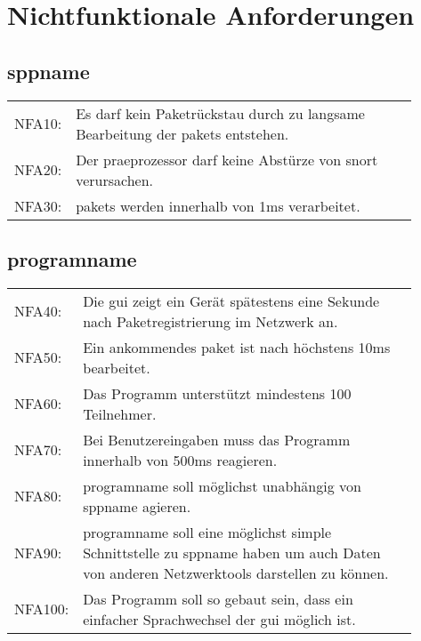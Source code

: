 \chapter{Nichtfunktionale Anforderungen}

\section{\gls{sppname}}
\begin{tabular}{lp{0.9\linewidth}}
NFA10: & Es darf kein Paketrückstau durch zu langsame Bearbeitung der \glspl{paket} entstehen. \\

NFA20: & Der \gls{praeprozessor} darf keine Abstürze von \gls{snort} verursachen. \\

NFA30: & \glspl{paket} werden innerhalb von 1ms verarbeitet.
\end{tabular}
\section{\gls{programname}}
\begin{tabular}{lp{0.9\linewidth}}
NFA40: & Die \gls{gui} zeigt ein Gerät spätestens eine Sekunde nach Paketregistrierung im Netzwerk an. \\

NFA50: & Ein ankommendes \gls{paket} ist nach höchstens 10ms bearbeitet. \\

NFA60: & Das Programm unterstützt mindestens 100 Teilnehmer. \\

NFA70: & Bei Benutzereingaben muss das Programm innerhalb von 500ms reagieren. \\

NFA80: & \gls{programname} soll möglichst unabhängig von \gls{sppname} agieren. \\

NFA90: & \gls{programname} soll eine möglichst simple Schnittstelle zu \gls{sppname} haben um auch Daten von anderen Netzwerktools darstellen zu können. \\

NFA100: & Das Programm soll so gebaut sein, dass ein einfacher Sprachwechsel der \gls{gui} möglich ist. \\
\end{tabular}
